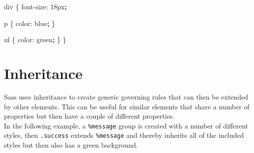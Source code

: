 \documentclass[]{book}
\newenvironment{Shaded}{\begin{snugshade}}{\end{snugshade}}
\newcommand{\ExtensionTok}[1]{#1}
\newcommand{\KeywordTok}[1]{\textcolor[rgb]{0.13,0.29,0.53}{\textbf{#1}}}
\newcommand{\NormalTok}[1]{#1}
\begin{document}
\begin{Shaded}
\begin{Highlighting}[]
\ExtensionTok{div}\NormalTok{ \{                }
    \ExtensionTok{font-size}\NormalTok{: 18px}\KeywordTok{;} 
                     
    \ExtensionTok{p}\NormalTok{ \{              }
        \ExtensionTok{color}\NormalTok{: blue}\KeywordTok{;} 
\NormalTok{    \}                }
                     
    \ExtensionTok{ul}\NormalTok{ \{             }
        \ExtensionTok{color}\NormalTok{: green}\KeywordTok{;}
\NormalTok{    \}                }
\NormalTok{\}                    }
\end{Highlighting}
\end{Shaded}

\hypertarget{inheritance}{%
\section{Inheritance}\label{inheritance}}

Sass uses inheritance to create generic governing rules that can then be extended by other elements. This can be useful for similar elements that share a number of properties but then have a couple of different properties.\\
In the following example, a \texttt{\%message} group is created with a number of different styles, then \texttt{.success} extends \texttt{\%message} and thereby inherits all of the included styles but then also has a green background.

\begin{Shaded}
\end{Shaded}
\end{document}
